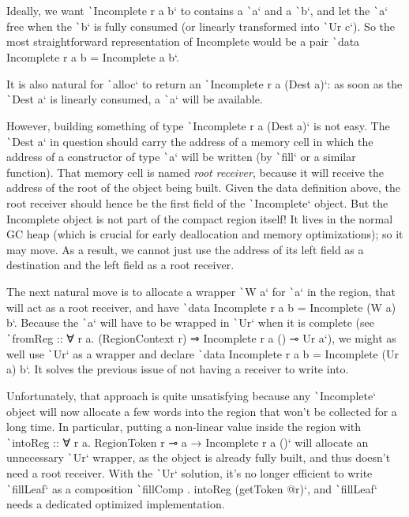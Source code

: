 \documentclass[english]{jflart}
\begin{document}
Ideally, we want \texttt`Incomplete r a b` to contains a \texttt`a` and a \texttt`b`, and let the \texttt`a` free when the \texttt`b` is fully consumed (or linearly transformed into \texttt`Ur c`). So the most straightforward representation of Incomplete would be a pair \texttt`data Incomplete r a b = Incomplete a b`.

It is also natural for \texttt`alloc` to return an \texttt`Incomplete r a (Dest a)`: as soon as the \texttt`Dest a` is linearly consumed, a \texttt`a` will be available.

However, building something of type \texttt`Incomplete r a (Dest a)` is not easy. The \texttt`Dest a` in question should carry the address of a memory cell in which the address of a constructor of type \texttt`a` will be written (by \texttt`fill` or a similar function). That memory cell is named \emph{root receiver}, because it will receive the address of the root of the object being built. Given the data definition above, the root receiver should hence be the first field of the \texttt`Incomplete` object. But the Incomplete object is not part of the compact region itself! It lives in the normal GC heap (which is crucial for early deallocation and memory optimizations); so it may move. As a result, we cannot just use the address of its left field as a destination and the left field as a root receiver.

The next natural move is to allocate a wrapper \texttt`W a` for \texttt`a` in the region, that will act as a root receiver, and have \texttt`data Incomplete r a b = Incomplete (W a) b`. Because the \texttt`a` will have to be wrapped in \texttt`Ur` when it is complete (see \texttt`fromReg :: ∀ r a. (RegionContext r) ⇒ Incomplete r a () ⊸ Ur a`), we might as well use \texttt`Ur` as a wrapper and declare \texttt`data Incomplete r a b = Incomplete (Ur a) b`. It solves the previous issue of not having a receiver to write into.

Unfortunately, that approach is quite unsatisfying because any \texttt`Incomplete` object will now allocate a few words into the region that won't be collected for a long time. In particular, putting a non-linear value inside the region with \texttt`intoReg :: ∀ r a. RegionToken r ⊸ a → Incomplete r a ()` will allocate an unnecessary \texttt`Ur` wrapper, as the object is already fully built, and thus doesn't need a root receiver. With the \texttt`Ur` solution, it's no longer efficient to write \texttt`fillLeaf` as a composition \texttt`fillComp . intoReg (getToken @r)`, and \texttt`fillLeaf` needs a dedicated optimized implementation.
\end{document}
